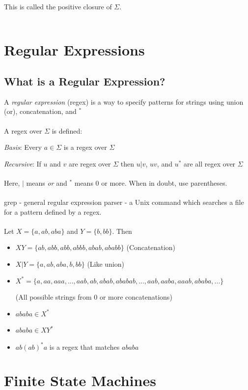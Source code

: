 \documentclass{scrartcl}
\begin{document}
This is called the positive closure of $\Sigma$.\\\\

\section{Regular Expressions}

\subsection{What is a Regular Expression?}

A \emph{regular expression} (regex) is a way to specify patterns for strings using union (or), concatenation, and $^*$\\\\
A regex over $\Sigma$ is defined:

\emph{Basis}: Every $a \in \Sigma$ is a regex over $\Sigma$

\emph{Recursive}: If $u$ and $v$ are regex over $\Sigma$ then $u|v$, $uv$, and $u^*$ are all regex over $\Sigma$\\\\
Here, $|$ means \emph{or} and $^*$ means 0 or more. When in doubt, use parentheses.\\\\
grep - general regular expression parser - a Unix command which searches a file for a pattern defined by a regex.\\\\
Let $X=\{a,ab,aba\}$ and $Y=\{b,bb\}$. Then
\begin{itemize}
\item $XY=\{ab,abb,abb,abbb,abab,ababb\}$ (Concatenation)
\item $X|Y=\{a,ab,aba,b,bb\}$ (Like union)
\item $X^*=\{a,aa,aaa,...,aab,ab,abab,ababab,...,aab,aaba,aaab,ababa,...\}$ 

(All possible strings from 0 or more concatenations)
\item $ababa \in X^*$
\item $ababa \in XY^*$
\item $ab(ab)^*a$ is a regex that matches $ababa$
\end{itemize}

\section{Finite State Machines}
\end{document}
